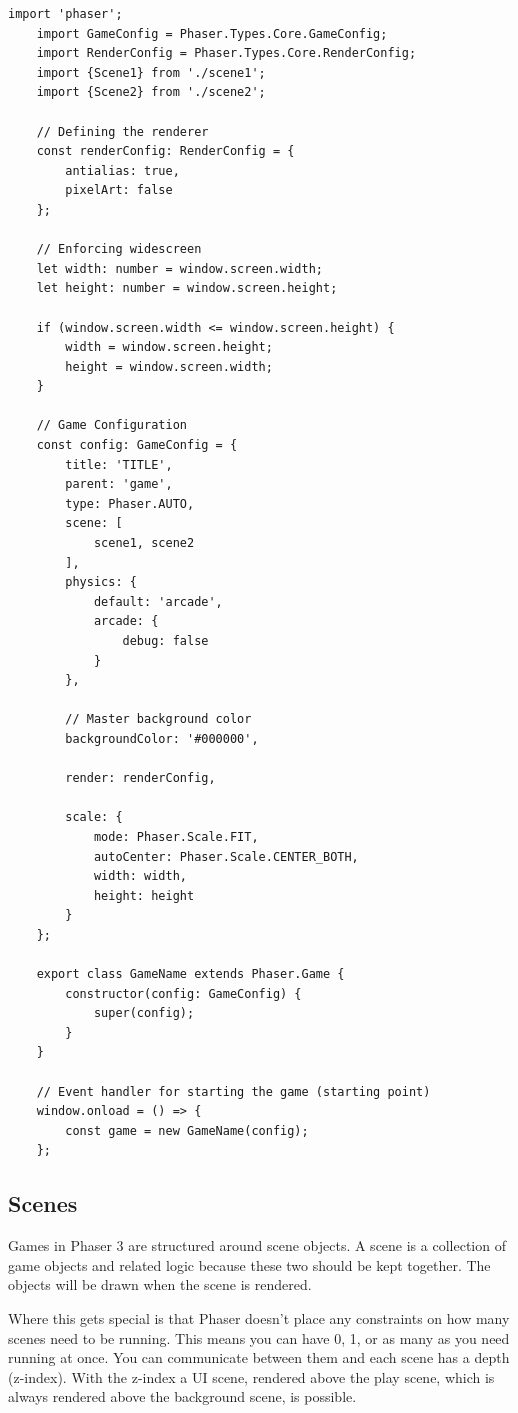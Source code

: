 \begin{lstlisting}[style=TypeScript, caption={Game Setup File}, label={lst:gamesetupfile}]
    import 'phaser';
    import GameConfig = Phaser.Types.Core.GameConfig;
    import RenderConfig = Phaser.Types.Core.RenderConfig;
    import {Scene1} from './scene1';
    import {Scene2} from './scene2';

    // Defining the renderer
    const renderConfig: RenderConfig = {
        antialias: true,
        pixelArt: false
    };

    // Enforcing widescreen
    let width: number = window.screen.width;
    let height: number = window.screen.height;

    if (window.screen.width <= window.screen.height) {
        width = window.screen.height;
        height = window.screen.width;
    }

    // Game Configuration
    const config: GameConfig = {
        title: 'TITLE',
        parent: 'game',
        type: Phaser.AUTO,
        scene: [
            scene1, scene2
        ],
        physics: {
            default: 'arcade',
            arcade: {
                debug: false
            }
        },

        // Master background color
        backgroundColor: '#000000',

        render: renderConfig,

        scale: {
            mode: Phaser.Scale.FIT,
            autoCenter: Phaser.Scale.CENTER_BOTH,
            width: width,
            height: height
        }
    };

    export class GameName extends Phaser.Game {
        constructor(config: GameConfig) {
            super(config);
        }
    }

    // Event handler for starting the game (starting point)
    window.onload = () => {
        const game = new GameName(config);
    };
\end{lstlisting}

\subsection{Scenes}\label{subsec:scenes}
Games in Phaser 3 are structured around scene objects.
A scene is a collection of game objects and related logic because these two should be kept together.
The objects will be drawn when the scene is rendered.

Where this gets special is that Phaser doesn't place any constraints on how many scenes need to be running.
This means you can have 0, 1, or as many as you need running at once.
You can communicate between them and each scene has a depth (z-index).
With the z-index a UI scene, rendered above the play scene, which is always rendered above the background scene, is possible.


